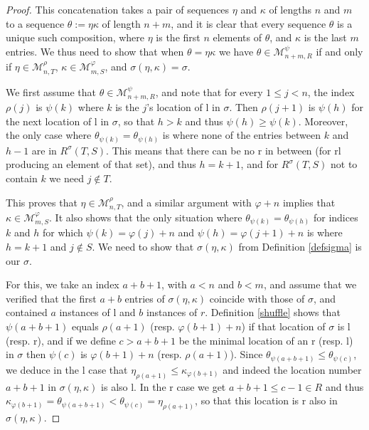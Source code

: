 \documentclass[10pt,a4paper]{amsart}
\begin{document}
\begin{proof}
This concatenation takes a pair of sequences $\eta$ and $\kappa$ of lengths $n$ and $m$ to a sequence $\theta:=\eta\kappa$ of length $n+m$, and it is clear that every sequence $\theta$ is a unique such composition, where $\eta$ is the first $n$ elements of $\theta$, and $\kappa$ is the last $m$ entries. We thus need to show that when $\theta=\eta\kappa$ we have $\theta\in\mathcal{M}_{n+m,R}^{\psi}$ if and only if $\eta\in\mathcal{M}_{n,T}^{\rho}$, $\kappa\in\mathcal{M}_{m,S}^{\varphi}$, and $\sigma(\eta,\kappa)=\sigma$.

We first assume that $\theta\in\mathcal{M}_{n+m,R}^{\psi}$, and note that for every $1 \leq j<n$, the index $\rho(j)$ is $\psi(k)$ where $k$ is the $j$'s location of l in $\sigma$. Then $\rho(j+1)$ is $\psi(h)$ for the next location of l in $\sigma$, so that $h>k$ and thus $\psi(h)\geq\psi(k)$. Moreover, the only case where $\theta_{\psi(k)}=\theta_{\psi(h)}$ is where none of the entries between $k$ and $h-1$ are in $R^{\sigma}(T,S)$. This means that there can be no r in between (for rl producing an element of that set), and thus $h=k+1$, and for $R^{\sigma}(T,S)$ not to contain $k$ we need $j \not\in T$.

This proves that $\eta\in\mathcal{M}_{n,T}^{\rho}$, and a similar argument with $\varphi+n$ implies that $\kappa\in\mathcal{M}_{m,S}^{\varphi}$. It also shows that the only situation where $\theta_{\psi(k)}=\theta_{\psi(h)}$ for indices $k$ and $h$ for which $\psi(k)=\varphi(j)+n$ and $\psi(h)=\varphi(j+1)+n$ is where $h=k+1$ and $j \not\in S$. We need to show that $\sigma(\eta,\kappa)$ from Definition \ref{defsigma} is our $\sigma$.

For this, we take an index $a+b+1$, with $a<n$ and $b<m$, and assume that we verified that the first $a+b$ entries of $\sigma(\eta,\kappa)$ coincide with those of $\sigma$, and contained $a$ instances of l and $b$ instances of $r$. Definition \ref{shuffle} shows that $\psi(a+b+1)$ equals $\rho(a+1)$ (resp. $\varphi(b+1)+n$) if that location of $\sigma$ is l (resp. r), and if we define $c>a+b+1$ be the minimal location of an r (resp. l) in $\sigma$ then $\psi(c)$ is $\varphi(b+1)+n$ (resp. $\rho(a+1)$). Since $\theta_{\psi(a+b+1)}\leq\theta_{\psi(c)}$, we deduce in the l case that $\eta_{\rho(a+1)}\leq\kappa_{\varphi(b+1)}$ and indeed the location number $a+b+1$ in $\sigma(\eta,\kappa)$ is also l. In the r case we get $a+b+1 \leq c-1 \in R$ and thus $\kappa_{\varphi(b+1)}=\theta_{\psi(a+b+1)}<\theta_{\psi(c)}=\eta_{\rho(a+1)}$, so that this location is r also in $\sigma(\eta,\kappa)$.


\end{proof}
\end{document}

